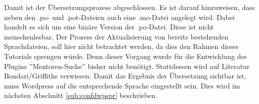 Damit ist der Übersetzungsprozess abgeschlossen. Es ist darauf hinzuweisen, dass neben den .po- und .pot-Dateien auch eine .mo-Datei angelegt wird. Dabei handelt es sich um eine binäre Version der .po-Datei. Diese ist nicht menschenlesbar.\newline
Der Prozess der Aktualisierung von bereits bestehenden Sprachdateien, soll hier nicht betrachtet werden, da dies den Rahmen dieses Tutorials sprengen würde. Denn dieser Vorgang wurde für die Entwicklung des Plugins ''Mentoren-Suche'' bisher nicht benötigt. Stattdessen wird auf Literatur Bondari/Griffiths verwiesen.\newline
Damit das Ergebnis der Übersetzung sichtbar ist, muss Wordpress auf die entsprechende Sprache eingestellt sein. Dies wird im nächsten Abschnitt \ref{sub:confdwpspr} beschrieben.
